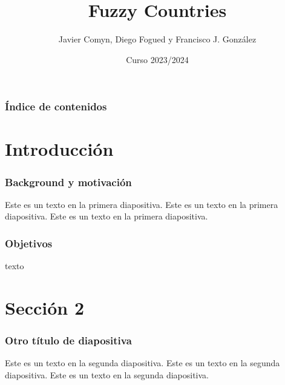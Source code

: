 \documentclass{beamer}
\title{Fuzzy Countries}
\author{Javier Comyn, Diego Fogued y Francisco J. González}
\institute{Universidad Polotécnica de Madrid}
\date{Curso 2023/2024}
\newcommand{\slideauthor}[1]{\def\insertslideauthor{#1}}
\newcommand{\insertslideauthor}{}
\begin{document}
\frame{\titlepage}

\begin{frame}
\frametitle{Índice de contenidos}
\tableofcontents
\end{frame}

\section{Introducción}
\begin{frame}
\frametitle{Background y motivación}
Este es un texto en la primera diapositiva. Este es un texto en la primera diapositiva. Este es un texto en la primera diapositiva.
\end{frame}
\begin{frame}
\frametitle{Objetivos}
texto
\end{frame}
\section{Sección 2}
\begin{frame}
\frametitle{Otro título de diapositiva}
\slideauthor{Autor 2}
Este es un texto en la segunda diapositiva. Este es un texto en la segunda diapositiva. Este es un texto en la segunda diapositiva.
\end{frame}
\end{document}
